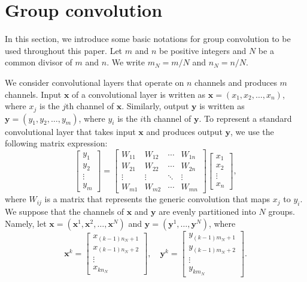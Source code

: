 \documentclass[preprint,12pt,authoryear]{elsarticle}
\numberwithin{equation}{section}
\theoremstyle{remark}
\newcommand\bx{\mathbf{x}}
\newcommand\by{\mathbf{y}}
\begin{document}
\section{Group convolution}
\label{Sec:GC}
In this section, we introduce some basic notations for group convolution to be used throughout this paper.
Let $m$ and $n$ be positive integers and $N$ be a common divisor of $m$ and $n$.
We write $m_N = m/N$ and $n_N = n/N$.

We consider convolutional layers that operate on $n$ channels and produces $m$ channels.
Input $\bx$ of a convolutional layer is written as $\bx = (x_{1}, x_{2}, \dots, x_{n})$, where $x_{j}$ is the $j$th channel of $\bx$.
Similarly, output $\by$ is written as $\by = (y_{1}, y_{2}, \dots, y_{m})$, where $y_{i}$ is the $i$th channel of $\by$.
To represent a standard convolutional layer that takes input $\bx$ and produces output $\by$, we use the following matrix expression:
\begin{equation}
\label{eqn:full}
\begin{bmatrix} y_{1} \\ y_{2} \\ \vdots \\ y_{m} \end{bmatrix}
= \begin{bmatrix} W_{11} & W_{12} & \cdots & W_{1n} \\
    W_{21} & W_{22} & \cdots & W_{2n} \\
    \vdots & \vdots & \ddots & \vdots \\
    W_{m1} & W_{m2} & \cdots & W_{mn} \end{bmatrix}
\begin{bmatrix} x_{1} \\ x_{2} \\ \vdots \\ x_{n} \end{bmatrix},
\end{equation}
where $W_{ij}$ is a matrix that represents the generic convolution that maps $x_{j}$ to $y_{i}$.
We suppose that the channels of $\bx$ and $\by$ are evenly partitioned into $N$ groups.
Namely, let $\bx = (\bx^1, \bx^2, \dots, \bx^N)$ and $\by = (\by^1, \dots, \by^N)$, where
\begin{equation*}
    \bx^k = \begin{bmatrix} x_{(k-1)n_N + 1} \\ x_{(k-1)n_N + 2} \\ \vdots \\ x_{k n_N} \end{bmatrix}, \quad
    \by^k = \begin{bmatrix} y_{(k-1)m_N + 1} \\ y_{(k-1)m_N + 2} \\ \vdots \\ y_{k m_N} \end{bmatrix}.
\end{equation*}
\end{document}
